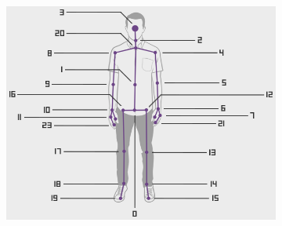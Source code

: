 \begin{figure}[H] 
  \centering
  \begin{subfigure}{.6\textwidth}
  \includegraphics[width=\linewidth]{pictures/kinectskeleton-map2-1.png}
  \end{subfigure}\hfill
  \begin{subfigure}{.38\textwidth}

\end{subfigure}
\end{figure}

